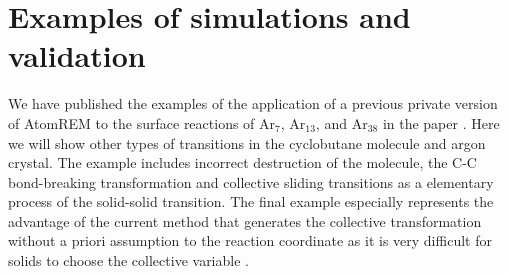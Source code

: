 \documentclass[preprint,12pt]{elsarticle}
\begin{document}



\newpage

\section{Examples of simulations and validation}
\label{sec:examples}

We have published the examples of the application of a previous private version of AtomREM to the surface reactions of Ar$_7$, Ar$_{13}$, and Ar$_{38}$ in the paper \cite{Nagornov}. Here we will show other types of transitions in the cyclobutane molecule and argon crystal. The example includes incorrect destruction of the molecule, the C-C bond-breaking transformation and collective sliding transitions as a elementary process of the solid-solid transition. The final example especially represents the advantage of the current method that generates the collective transformation without a priori assumption to the reaction coordinate as it is very difficult for solids to choose the collective variable \cite{PhysRevLett.119.015701}.


\end{document}
